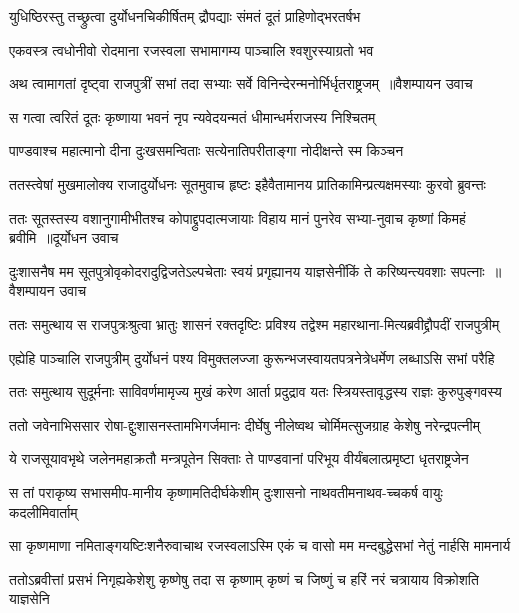 \twolineshloka
{युधिष्ठिरस्तु तच्छ्रुत्वा दुर्योधनचिकीर्षितम्}
{द्रौपद्याः संमतं दूतं प्राहिणोद्भरतर्षभ}


\twolineshloka
{एकवस्त्र त्वधोनीवो रोदमाना रजस्वला}
{सभामागम्य पाञ्चालि श्वशुरस्याग्रतो भव}


\twolineshloka
{अथ त्वामागतां दृष्ट्वा राजपुत्रीं सभां तदा}
{सभ्याः सर्वे विनिन्देरन्मनोर्भिर्धृतराष्ट्रजम् ॥वैशम्पायन उवाच}


\twolineshloka
{स गत्वा त्वरितं दूतः कृष्णाया भवनं नृप}
{न्यवेदयन्मतं धीमान्धर्मराजस्य निश्चितम्}


\twolineshloka
{पाण्डवाश्च महात्मानो दीना दुःखसमन्विताः}
{सत्येनातिपरीताङ्गा नोदीक्षन्ते स्म किञ्चन}


\twolineshloka
{ततस्त्वेषां मुखमालोक्य राजादुर्योधनः सूतमुवाच हृष्टः}
{इहैवैतामानय प्रातिकामिन्प्रत्यक्षमस्याः कुरवो ब्रुवन्तः}


\threelineshloka
{ततः सूतस्तस्य वशानुगामीभीतश्च कोपाद्द्रुपदात्मजायाः}
{विहाय मानं पुनरेव सभ्या-नुवाच कृष्णां किमहं ब्रवीमि ॥दूर्योधन उवाच}
{}


\twolineshloka
{दुःशासनैष मम सूतपुत्रोवृकोदरादुद्विजतेऽल्पचेताः}
{स्वयं प्रगृह्यानय याज्ञसेनींकिं ते करिष्यन्त्यवशाः सपत्नाः ॥वैशम्पायन उवाच}


\twolineshloka
{ततः समुत्थाय स राजपुत्रःश्रुत्वा भ्रातुः शासनं रक्तदृष्टिः}
{प्रविश्य तद्वेश्म महारथाना-मित्यब्रवीद्द्रौपदीं राजपुत्रीम्}


\threelineshloka
{एह्येहि पाञ्चालि राजपुत्रीम्}
{दुर्योधनं पश्य विमुक्तलज्जा}
{कुरून्भजस्वायतपत्रनेत्रेधर्मेण लब्धाऽसि सभां परैहि}


\twolineshloka
{ततः समुत्थाय सुदूर्मनाः साविवर्णमामृज्य मुखं करेण}
{आर्ता प्रदुद्राव यतः स्त्रियस्तावृद्धस्य राज्ञः कुरुपुङ्गवस्य}


\twolineshloka
{ततो जवेनाभिससार रोषा-द्दुःशासनस्तामभिगर्जमानः}
{दीर्घेषु नीलेष्वथ चोर्मिमत्सुजग्राह केशेषु नरेन्द्रपत्नीम्}


\twolineshloka
{ये राजसूयावभृथे जलेनमहाक्रतौ मन्त्रपूतेन सिक्ताः}
{ते पाण्डवानां परिभूय वीर्यंबलात्प्रमृष्टा धृतराष्ट्रजेन}


\twolineshloka
{स तां पराकृष्य सभासमीप-मानीय कृष्णामतिदीर्घकेशीम्}
{दुःशासनो नाथवतीमनाथव-च्चकर्ष वायुः कदलीमिवार्ताम्}


\twolineshloka
{सा कृष्णमाणा नमिताङ्गयष्टिःशनैरुवाचाथ रजस्वलाऽस्मि}
{एकं च वासो मम मन्दबुद्धेसभां नेतुं नार्हसि मामनार्य}


\twolineshloka
{ततोऽब्रवीत्तां प्रसभं निगृह्यकेशेशु कृष्णेषु तदा स कृष्णाम्}
{कृष्णं च जिष्णुं च हरिं नरं चत्रायाय विक्रोशति याज्ञसेनि}


